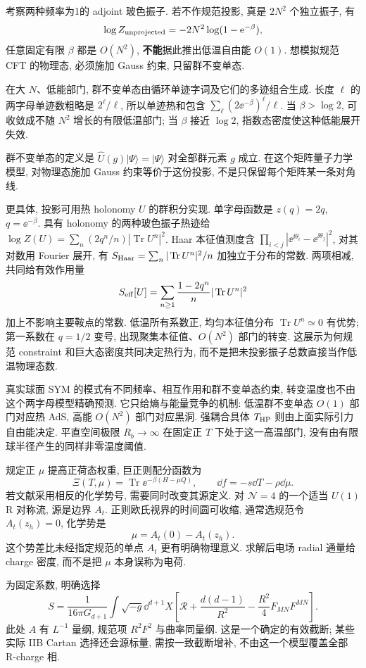 考察两种频率为1的 adjoint 玻色振子. 若不作规范投影, 真是 $2N^2$ 个独立振子, 有
\[
\log Z_{\rm unprojected}=-2N^2\log(1-\mathrm e^{-\beta}),
\]
任意固定有限 $\beta$ 都是 $O(N^2)$, \textbf{不能}据此推出低温自由能 $O(1)$. 想模拟规范 CFT 的物理态, 必须施加 Gauss 约束, 只留群不变单态.

在大 $N$、低能部门, 群不变单态由循环单迹字词及它们的多迹组合生成. 长度 $\ell$ 的两字母单迹数粗略是 $2^\ell/\ell$, 所以单迹热和包含 $\sum_\ell(2\ee^{-\beta})^\ell/\ell$. 当 $\beta>\log2$, 可收敛成不随 $N^2$ 增长的有限低温部门; 当 $\beta$ 接近 $\log2$, 指数态密度使这种低能展开失效.

群不变单态的定义是 $\widehat U(g)|\Psi\rangle=|\Psi\rangle$ 对全部群元素 $g$ 成立. 在这个矩阵量子力学模型, 对物理态施加 Gauss 约束等价于这份投影, 不是只保留每个矩阵某一条对角线.

更具体, 投影可用热 holonomy $U$ 的群积分实现. 单字母函数是 $z(q)=2q$, $q=\ee^{-\beta}$. 具有 holonomy 的两种玻色振子热迹给 $\log Z(U)=\sum_n(2q^n/n)|\operatorname{Tr}U^n|^2$. Haar 本征值测度含 $\prod_{i<j}|\ee^{\ii\theta_i}-\ee^{\ii\theta_j}|^2$, 对其对数用 Fourier 展开, 有 $S_{\rm Haar}=\sum_n|\operatorname{Tr}U^n|^2/n$ 加独立于分布的常数. 两项相减, 共同给有效作用量
\[
S_{\rm eff}[U]=\sum_{n\ge1}\frac{1-2q^n}{n}
|\operatorname{Tr}U^n|^2
\]
加上不影响主要鞍点的常数. 低温所有系数正, 均匀本征值分布 $\operatorname{Tr}U^n\simeq0$ 有优势; 第一系数在 $q=1/2$ 变号, 出现聚集本征值、$O(N^2)$ 部门的转变. 这展示为何规范 constraint 和巨大态密度共同决定热行为, 而不是把未投影振子总数直接当作低温物理态数.

真实球面 SYM 的模式有不同频率、相互作用和群不变单态约束, 转变温度也不由这个两字母模型精确预测. 它只给熵与能量竞争的机制: 低温群不变单态 $O(1)$ 部门对应热 AdS, 高能 $O(N^2)$ 部门对应黑洞. 强耦合具体 $T_{\rm HP}$ 则由上面实际引力自由能决定. 平直空间极限 $R_b\to\infty$ 在固定正 $T$ 下处于这一高温部门, 没有由有限球半径产生的同样非零温度阈值.

规定正 $\mu$ 提高正荷态权重, 巨正则配分函数为
\[
\Xi(T,\mu)=\operatorname{Tr}\ee^{-\beta(H-\mu Q)},
\qquad \dd f=-s\dd T-\rho\dd\mu.
\]
若文献采用相反的化学势号, 需要同时改变其源定义. 对 $\mathcal N=4$ 的一个适当 $U(1)$ R 对称流, 源是边界 $A_t$. 正则欧氏视界的时间圆可收缩, 通常选规范令 $A_t(z_h)=0$, 化学势是
\[
\mu=A_t(0)-A_t(z_h).
\]
这个势差比未经指定规范的单点 $A_t$ 更有明确物理意义. 求解后电场 radial 通量给 charge 密度, 而不是把 $\mu$ 本身误称为电荷.

为固定系数, 明确选择
\[
S=\frac1{16\pi G_{d+1}}\int\sqrt{-g}\dd^{d+1}X
\left[\mathcal R+\frac{d(d-1)}{R^2}-\frac{R^2}{4}F_{MN}F^{MN}\right].
\]
此处 $A$ 有 $L^{-1}$ 量纲, 规范项 $R^2F^2$ 与曲率同量纲. 这是一个确定的有效截断; 某些实际 IIB Cartan 选择还会源标量, 需按一致截断增补, 不由这一个模型覆盖全部 R-charge 相.

